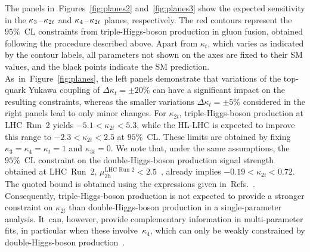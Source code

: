 \documentclass{SciPost}
\providecommand{\DIFaddtex}[1]{{\protect\color{red} #1}} %
\providecommand{\DIFdeltex}[1]{} %
\providecommand{\DIFaddbegin}{} %
\providecommand{\DIFaddend}{} %
\providecommand{\DIFdelbegin}{} %
\providecommand{\DIFdelend}{} %
\providecommand{\DIFadd}[1]{\texorpdfstring{\DIFaddtex{#1}}{#1}} %
\providecommand{\DIFdel}[1]{\texorpdfstring{\DIFdeltex{#1}}{}} %
\begin{document}
The panels in~Figures~\ref{fig:planes2} and~\ref{fig:planes3} show the expected sensitivity in the $\kappa_3\hspace{0.25mm}$--$\hspace{0.25mm}\kappa_{2t}$ and $\kappa_4\hspace{0.25mm}$--$\hspace{0.25mm}\kappa_{2t}$ planes, respectively. The red contours represent the $95\%$~CL constraints from \DIFdelbegin \DIFdel{triple-Higgs }\DIFdelend \DIFaddbegin \DIFadd{triple-Higgs-boson }\DIFaddend production in gluon fusion, obtained following the procedure described above. \DIFdelbegin \DIFdel{Parameters not shown explicitly are fixed to their SM values}\DIFdelend \DIFaddbegin \DIFadd{Apart from $\kappa_t$, which varies as indicated by the contour labels, all parameters not shown on the axes are fixed to their SM values}\DIFaddend, and the black \DIFdelbegin \DIFdel{dots }\DIFdelend \DIFaddbegin \DIFadd{points }\DIFaddend indicate the SM prediction. As~in~Figure~\ref{fig:planes}, the left panels demonstrate that variations of the top-quark Yukawa coupling of $\Delta\kappa_t=\pm20\%$ can have a significant impact on the resulting constraints, whereas the smaller variations $\Delta\kappa_t=\pm5\%$ considered in the right panels lead to only minor changes. For $\kappa_{2t}$, \DIFdelbegin \DIFdel{triple-Higgs }\DIFdelend \DIFaddbegin \DIFadd{triple-Higgs-boson }\DIFaddend production at LHC~Run~2 yields $-5.1 < \kappa_{2t} < 5.3$, while the HL-LHC is expected to improve this range to $-2.3 < \kappa_{2t} < 2.5$ at $95\%$~CL. These limits are obtained by fixing $\kappa_3=\kappa_4=\kappa_t=1$ \DIFaddbegin \DIFadd{and $\kappa_{3t}=0$}\DIFaddend . We note that, under the same assumptions, the $95\%$~CL constraint on the \DIFdelbegin \DIFdel{double-Higgs }\DIFdelend \DIFaddbegin \DIFadd{double-Higgs-boson }\DIFaddend production signal strength obtained at LHC~Run~2, $\mu_{2h}^{\text{LHC~Run~2}}<2.5$~\cite{CMS:2026nuu}, already implies $-0.19 < \kappa_{2t} < 0.72$. The quoted bound is obtained using the expressions given in~Refs.~\cite{Buchalla:2018yce,Brivio:2025sib}. Consequently, \DIFdelbegin \DIFdel{triple-Higgs }\DIFdelend \DIFaddbegin \DIFadd{triple-Higgs-boson }\DIFaddend production is not expected to provide a stronger constraint on $\kappa_{2t}$ than \DIFdelbegin \DIFdel{double-Higgs }\DIFdelend \DIFaddbegin \DIFadd{double-Higgs-boson }\DIFaddend production in a single-parameter analysis. It~can, however, provide complementary information in multi-parameter fits, in particular when these involve~$\kappa_4$, which can only be weakly constrained by \DIFdelbegin \DIFdel{double-Higgs }\DIFdelend \DIFaddbegin \DIFadd{double-Higgs-boson }\DIFaddend production~\cite{Bizon:2018syu,Borowka:2018pxx,Li:2024iio,Ding:2026qto}.
\end{document}
